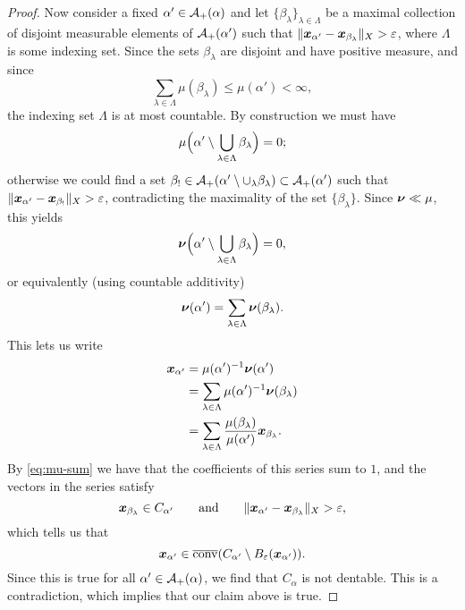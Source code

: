 \begin{proof}
  Now consider a fixed $\alpha' \in \mathcal{A}_{+}(\alpha)$ and let $\{\beta_{\lambda}\}_{\lambda \in \Lambda}$ be a maximal collection of disjoint measurable elements of $\mathcal{A}_+(\alpha')$ such that $\|\bm{x}_{\alpha'} - \bm{x}_{\beta_\lambda}\|_{X} > \varepsilon$, where $\Lambda$ is some indexing set.
  Since the sets $\beta_{\lambda}$ are disjoint and have positive measure, and since
  \begin{equation*}
    \sum_{\lambda \in \Lambda} \mu(\beta_{\lambda}) \leq \mu(\alpha') < \infty,
  \end{equation*}
  the indexing set $\Lambda$ is at most countable.
  By construction we must have
  \begin{equation}\label{eq:mu-sum}
    \mu\Big(\alpha' \setminus \bigcup_{\lambda \in \Lambda} \beta_\lambda\Big) = 0;
  \end{equation}
  otherwise we could find a set $\beta_{!} \in \mathcal{A}_{+}(\alpha' \setminus \cup_{\lambda} \beta_{\lambda}) \subset \mathcal{A}_{+}(\alpha')$ such that $\|\bm{x}_{\alpha'} - \bm{x}_{\beta_{!}}\|_{X} > \varepsilon$, contradicting the maximality of the set $
  \{\beta_{\lambda}\}$.
  Since $\bm{\nu} \ll \mu$, this yields
  \begin{equation*}
    \bm{\nu}\Big(\alpha' \setminus \bigcup_{\lambda \in \Lambda} \beta_\lambda\Big) = 0,
  \end{equation*}
  or equivalently (using countable additivity)
  \begin{equation*}
    \bm{\nu}(\alpha') = \sum_{\lambda \in \Lambda} \bm{\nu}(\beta_\lambda).
  \end{equation*}
  This lets us write
  \begin{equation*}
    \begin{aligned}
      \bm{x}_{\alpha'}
      &= \mu(\alpha')^{-1}\bm{\nu}(\alpha') \\
      &= \sum_{\lambda \in \Lambda} \mu(\alpha')^{-1}\bm{\nu}(\beta_\lambda) \\
      &= \sum_{\lambda \in \Lambda} \frac{\mu(\beta_\lambda)}{\mu(\alpha')} \bm{x}_{\beta_\lambda}.
    \end{aligned}
  \end{equation*}
  By \eqref{eq:mu-sum} we have that the coefficients of this series sum to $1$, and the vectors in the series satisfy
  \begin{equation*}
    \bm{x}_{\beta_{\lambda}} \in C_{\alpha'} \qquad \text{and} \qquad \| \bm{x}_{\alpha'}- \bm{x}_{\beta_\lambda} \|_X > \varepsilon,
  \end{equation*}
  which tells us that
  \begin{equation*}
    \bm{x}_{\alpha'} \in \overline{\mathrm{conv}}(C_{\alpha'} \setminus B_{\varepsilon}(\bm{x}_{\alpha'})).
  \end{equation*}
  Since this is true for all $\alpha' \in \mathcal{A}_{+}(\alpha)$, we find that $C_{\alpha}$ is not dentable.
  This is a contradiction, which implies that our claim above is true.


\end{proof}

